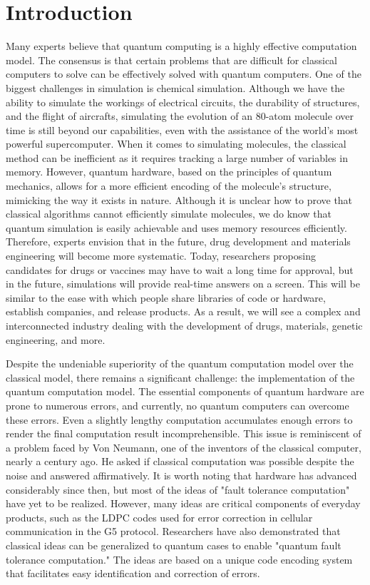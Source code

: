 \chapter{Introduction}
Many experts believe that quantum computing is a highly effective computation model. The consensus is that certain problems that are difficult for classical computers to solve can be effectively solved with quantum computers. One of the biggest challenges in simulation is chemical simulation. Although we have the ability to simulate the workings of electrical circuits, the durability of structures, and the flight of aircrafts, simulating the evolution of an 80-atom molecule over time is still beyond our capabilities, even with the assistance of the world's most powerful supercomputer. When it comes to simulating molecules, the classical method can be inefficient as it requires tracking a large number of variables in memory. However, quantum hardware, based on the principles of quantum mechanics, allows for a more efficient encoding of the molecule's structure, mimicking the way it exists in nature. Although it is unclear how to prove that classical algorithms cannot efficiently simulate molecules, we do know that quantum simulation is easily achievable and uses memory resources efficiently. Therefore, experts envision that in the future, drug development and materials engineering will become more systematic. Today, researchers proposing candidates for drugs or vaccines may have to wait a long time for approval, but in the future, simulations will provide real-time answers on a screen. This will be similar to the ease with which people share libraries of code or hardware, establish companies, and release products. As a result, we will see a complex and interconnected industry dealing with the development of drugs, materials, genetic engineering, and more.

Despite the undeniable superiority of the quantum computation model over the classical model, there remains a significant challenge: the implementation of the quantum computation model. The essential components of quantum hardware are prone to numerous errors, and currently, no quantum computers can overcome these errors. Even a slightly lengthy computation accumulates enough errors to render the final computation result incomprehensible. This issue is reminiscent of a problem faced by Von Neumann, one of the inventors of the classical computer, nearly a century ago. He asked if classical computation was possible despite the noise and answered affirmatively. It is worth noting that hardware has advanced considerably since then, but most of the ideas of "fault tolerance computation" have yet to be realized. However, many ideas are critical components of everyday products, such as the LDPC codes used for error correction in cellular communication in the G5 protocol. Researchers have also demonstrated that classical ideas can be generalized to quantum cases to enable "quantum fault tolerance computation." The ideas are based on a unique code encoding system that facilitates easy identification and correction of errors.

